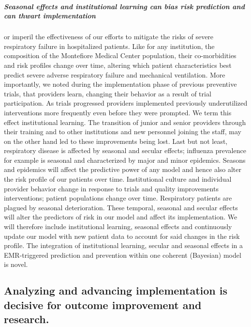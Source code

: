 \documentclass[11pt,notitlepage]{article}
\begin{document}
\subparagraph*{Seasonal effects and institutional learning can bias risk prediction and can thwart implementation} or imperil the effectiveness of our efforts to mitigate the risks of severe respiratory failure in hospitalized patients. Like for any institution, the composition of the Montefiore Medical Center population, their co-morbidities and risk profiles change over time, altering which patient characteristics best predict severe adverse respiratory failure and mechanical ventilation. More importantly, we noted during the implementation phase of previous preventive trials, that providers learn, changing their behavior as a result of trial participation. As trials progressed providers implemented previously underutilized interventions more frequently even before they were prompted. We term this effect institutional learning. The transition of junior and senior providers through their training and to other institutions and new personnel joining the staff, may on the other hand led to these improvements being lost. Last but not least, respiratory disease is affected by seasonal and secular effects; influenza prevalence for example is seasonal and characterized by major and minor epidemics. Seasons and epidemics will affect the predictive power of any model and hence also alter the risk profile of our patients over time. Institutional culture and individual provider behavior change in response to trials and quality improvements interventions; patient populations change over time. Respiratory patients are plagued by seasonal deterioration. These temporal, seasonal and secular effects will alter the predictors of risk in our model and affect its implementation. We will therefore include institutional learning, seasonal effects and continuously update our model with new patient data to account for said changes in the risk profile. The integration of institutional learning, secular and seasonal effects in a EMR-triggered prediction and prevention within one coherent (Bayesian) model is novel. 

\subsection*{Analyzing and advancing implementation is decisive for outcome improvement and research.}
\end{document}
